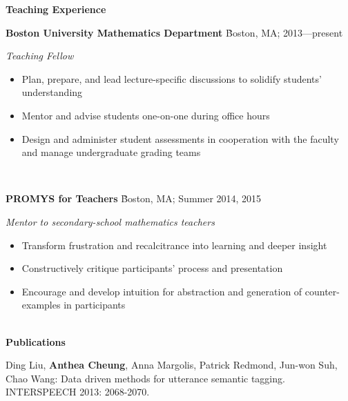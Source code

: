 \documentclass[letter, 11pt]{article}
\newcommand{\job}[5]{
  \parbox[l]{\textwidth}{

    \begin{tabbing} {\large \bf #1} \` {\small #2; #3} \end{tabbing}
    \textit{#4}

    \begin{itemize}
      #5
    \end{itemize}
  }
  \vspace{0.4cm}\\
}
\newcommand{\heading}[1]{\Large \textbf{#1} \vspace{0.4cm}}
\begin{document}

\heading{Teaching Experience}

\job{Boston University Mathematics Department}
    {Boston, MA}
    {2013---present}
    {Teaching Fellow}{
    \item Plan, prepare, and lead lecture-specific discussions to solidify
      students' understanding
    \item Mentor and advise students one-on-one during office hours
    \item Design and administer student assessments in cooperation with the
      faculty and manage undergraduate grading teams
}

\job{PROMYS for Teachers}
    {Boston, MA}
    {Summer 2014, 2015}
    {Mentor to secondary-school mathematics teachers}{
    \item Transform frustration and recalcitrance into learning and deeper insight
    \item Constructively critique participants' process and presentation
    \item Encourage and develop intuition for abstraction and generation of
      counter-examples in participants
}

\heading{Publications}

\normalsize
Ding Liu, \textbf{Anthea Cheung}, Anna Margolis, Patrick Redmond, Jun-won Suh, Chao Wang: Data driven methods for utterance semantic tagging. INTERSPEECH 2013: 2068-2070.
\vspace{0.4cm}\\
\end{document}
